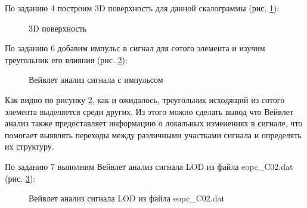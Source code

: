 \documentclass[a4paper,oneside,14pt]{extreport}
\begin{document}
По заданию 4 построим 3D поверхность для данной скалограммы (рис. \ref{task4}):

\begin{figure}[!h]
	\caption{3D поверхность}
	\label{task4}
\end{figure}

\newpage
По заданию 6 добавим импульс в сигнал для сотого элемента и изучим треугольник его влияния (рис. \ref{task6}):

\begin{figure}[!h]
	\caption{Вейвлет анализ сигнала с импульсом}
	\label{task6}
\end{figure}

Как видно по рисунку \ref{task6}, как и ожидалось, треугольник исходящий из сотого элемента выделяется среди других. Из этого можно сделать вывод что Вейвлет анализ также предоставляет информацию о локальных изменениях в сигнале, что помогает выявлять переходы между различными участками сигнала и определять их структуру.

\newpage
По заданию 7 выполним Вейвлет анализ сигнала LOD из файла eopc\_C02.dat (рис. \ref{task7}):

\begin{figure}[!h]
	\caption{Вейвлет анализ сигнала LOD из файла eopc\_C02.dat}
	\label{task7}
\end{figure}
\end{document}
